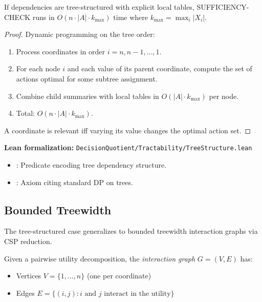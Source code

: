 \begin{theorem}\label{thm:tree-struct}
If dependencies are tree-structured with explicit local tables, SUFFICIENCY-CHECK runs in $O(n \cdot |A| \cdot k_{\max})$ time where $k_{\max} = \max_i |X_i|$.
\end{theorem}

\begin{proof}
Dynamic programming on the tree order:
\begin{enumerate}
\item Process coordinates in order $i = n, n-1, \ldots, 1$.
\item For each node $i$ and each value of its parent coordinate, compute the set of actions optimal for some subtree assignment.
\item Combine child summaries with local tables in $O(|A| \cdot k_{\max})$ per node.
\item Total: $O(n \cdot |A| \cdot k_{\max})$.
\end{enumerate}
A coordinate is relevant iff varying its value changes the optimal action set.
\end{proof}

\noindent\textbf{Lean formalization:} \texttt{DecisionQuotient/Tractability/TreeStructure.lean}
\begin{itemize}
\item {}: Predicate encoding tree dependency structure.
\item {}: Axiom citing standard DP on trees.
\end{itemize}

\subsection{Bounded Treewidth}\label{sec:tract-treewidth}

The tree-structured case generalizes to bounded treewidth interaction graphs via CSP reduction.

\begin{definition}\label{def:interaction-graph}
Given a pairwise utility decomposition, the \emph{interaction graph} $G = (V, E)$ has:
\begin{itemize}
\item Vertices $V = \{1, \ldots, n\}$ (one per coordinate)
\item Edges $E = \{(i, j) : i \text{ and } j \text{ interact in the utility}\}$
\end{itemize}
\end{definition}

